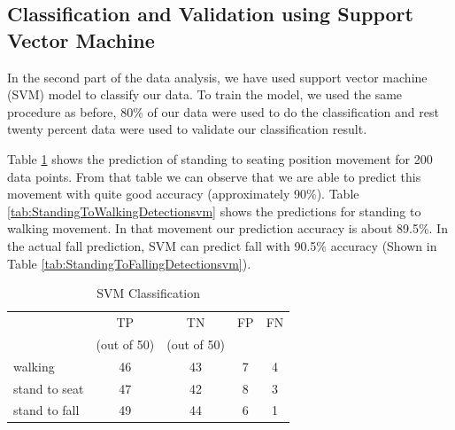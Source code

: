 \documentclass[letterpaper]{article}
\begin{document}
\subsection*{Classification and Validation using Support Vector Machine}

In the second part of the data analysis, we have used support vector machine (SVM) model
to classify our data. To train the model, we used the same procedure as before, 80\% of
our data were used to do the classification and rest twenty percent data were used to validate our
classification result.

Table \ref{tab:StandingToSeatingDetectionsvm} shows the prediction of standing to seating position
movement for 200 data points. From that table we can observe that we are able to predict this
movement with quite good accuracy (approximately 90\%). Table
\ref{tab:StandingToWalkingDetectionsvm} shows the predictions for standing to
walking movement. In that movement our prediction accuracy is about 89.5\%. In the actual fall
prediction, SVM can predict fall with 90.5\% accuracy (Shown in Table
\ref{tab:StandingToFallingDetectionsvm}).




\begin{table}[!ht]
\caption{SVM Classification}
	\label{tab:StandingToSeatingDetectionsvm}
	\centering
		\begin{tabular} {l |c |c |c|c}
			&TP  &	TN  &	FP &	FN \\
			&(out of 50) & (out of 50)& & \\ \hline
			walking	& 46	& 43	& 7	& 4 \\ \hline
			stand to seat	& 47	& 42	& 8 & 	3	 \\ \hline 
			stand to fall	& 49	& 44	& 6	& 1	 \\ \hline
		\end{tabular}
\end{table}
%
%
\end{document}
